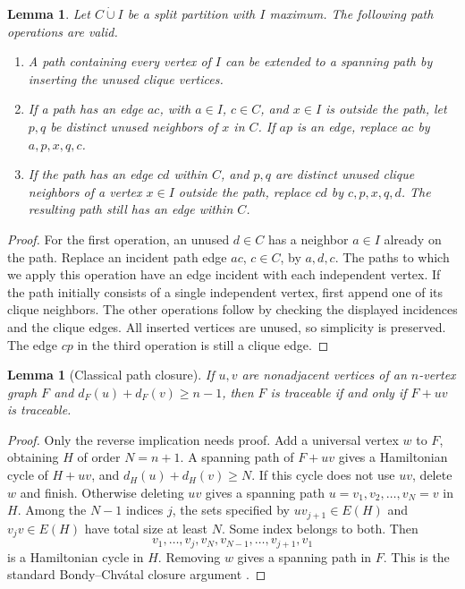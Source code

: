 \documentclass[11pt,a4paper]{article}
\newtheorem{lemma}[theorem]{Lemma}
\theoremstyle{definition}\newtheorem{definition}[theorem]{Definition}
\theoremstyle{remark}\newtheorem{remark}[theorem]{Remark}
\begin{document}
\begin{lemma}\label{split17:lem:insertions}
Let $C\mathbin{\dot\cup}I$ be a split partition with $I$ maximum.
The following path operations are valid.
\begin{enumerate}
\item A path containing every vertex of $I$ can be extended to a spanning
path by inserting the unused clique vertices.
\item If a path has an edge $ac$, with $a\in I$, $c\in C$, and $x\in I$
is outside the path, let $p,q$ be distinct unused neighbors of $x$ in $C$.
If $ap$ is an edge, replace $ac$ by $a,p,x,q,c$.
\item If the path has an edge $cd$ within $C$, and $p,q$ are distinct unused
clique neighbors of a vertex $x\in I$ outside the path, replace $cd$ by
$c,p,x,q,d$. The resulting path still has an edge within $C$.
\end{enumerate}
\end{lemma}
\begin{proof}
For the first operation, an unused $d\in C$ has a neighbor $a\in I$ already
on the path. Replace an incident path edge $ac$, $c\in C$, by $a,d,c$.
The paths to which we apply this operation have an edge incident with
each independent vertex. If the path initially consists of a single
independent vertex, first append one of its clique neighbors.
The other operations follow by checking the displayed incidences and the
clique edges. All inserted vertices are unused, so simplicity is preserved.
The edge $cp$ in the third operation is still a clique edge.
\end{proof}

\begin{lemma}[Classical path closure]\label{split17:lem:closure}
If $u,v$ are nonadjacent vertices of an $n$-vertex graph $F$ and
$d_F(u)+d_F(v)\ge n-1$, then $F$ is traceable if and only if $F+uv$ is
traceable.
\end{lemma}
\begin{proof}
Only the reverse implication needs proof. Add a universal vertex $w$ to
$F$, obtaining $H$ of order $N=n+1$. A spanning path of $F+uv$ gives a
Hamiltonian cycle of $H+uv$, and $d_H(u)+d_H(v)\ge N$. If this cycle does
not use $uv$, delete $w$ and finish. Otherwise deleting $uv$ gives a
spanning path $u=v_1,v_2,\ldots,v_N=v$ in $H$.
Among the $N-1$ indices $j$, the sets specified by $uv_{j+1}\in E(H)$ and
$v_jv\in E(H)$ have total size at least $N$. Some index belongs to both.
Then
\[
 v_1,\ldots,v_j,v_N,v_{N-1},\ldots,v_{j+1},v_1
\]
is a Hamiltonian cycle in $H$. Removing $w$ gives a spanning path in $F$.
This is the standard Bondy--Chv\'atal closure argument \cite{src:bc}.
\end{proof}
\end{document}
